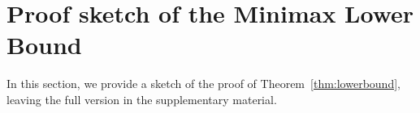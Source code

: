 \documentclass[preprint,11pt]{article}
\newcommand{\mbb}{\mathbb}
\numberwithin{equation}{section}
\begin{document}


\section{Proof sketch of the Minimax Lower Bound}\label{sec:LBproof}
In this section, we provide a sketch of the proof of Theorem~\ref{thm:lowerbound}, leaving the full version in the supplementary material. 
 
\end{document}
